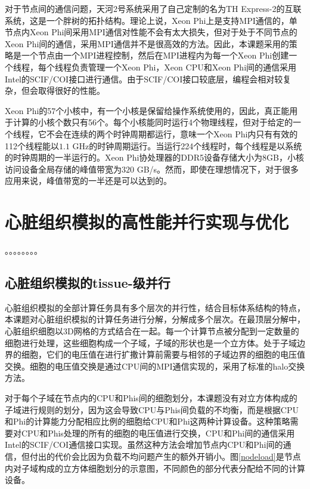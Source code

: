 对于节点间的通信问题，天河2号系统采用了自己定制的名为TH Express-2的互联系统，这是一个胖树的拓扑结构。理论上说，Xeon Phi上是支持MPI通信的，单节点内Xeon Phi间采用MPI通信对性能不会有太大损失，但对于处于不同节点的Xeon Phi间的通信，采用MPI通信并不是很高效的方法。因此，本课题采用的策略是一个节点由一个MPI进程控制，然后在MPI进程内为每一个Xeon Phi创建一个线程，每个线程负责管理一个Xeon Phi，Xeon CPU和Xeon Phi间的通信采用Intel的SCIF/COI接口进行通信。由于SCIF/COI接口较底层，编程会相对较复杂，但会取得很好的性能。

Xeon Phi的57个小核中，有一个小核是保留给操作系统使用的，因此，真正能用于计算的小核个数只有56个。每个小核能同时运行4个物理线程，但对于给定的一个线程，它不会在连续的两个时钟周期都运行，意味一个Xeon Phi内只有有效的112个线程能以$1.1$ GHz的时钟周期运行。当运行224个线程时，每个线程是以系统的时钟周期的一半运行的。Xeon Phi协处理器的DDR5设备存储大小为8GB，小核访问设备全局存储的峰值带宽为$320$ GB/s。然而，即使在理想情况下，对于很多应用来说，峰值带宽的一半还是可以达到的。


\section{心脏组织模拟的高性能并行实现与优化}

。。。。。。。。

\subsection{心脏组织模拟的tissue-级并行}
\label{tissueParallel}
心脏组织模拟的全部计算任务具有多个层次的并行性，结合目标体系结构的特点，本课题对心脏组织模拟的计算任务进行分解，分解成多个层次。在最顶层分解中，心脏组织细胞以3D网格的方式结合在一起。每一个计算节点被分配到一定数量的细胞进行处理，这些细胞构成一个子域，子域的形状也是一个立方体。处于子域边界的细胞，它们的电压值在进行扩撒计算前需要与相邻的子域边界的细胞的电压值交换。细胞的电压值交换是通过CPU间的MPI通信实现的，采用了标准的halo交换方法。

对于每个子域在节点内的CPU和Phis间的细胞划分，本课题没有对立方体构成的子域进行规则的划分，因为这会导致CPU与Phis间负载的不均衡，而是根据CPU和Phi的计算能力分配相应比例的细胞给CPU和Phi这两种计算设备。这种策略需要对CPU和Phis处理的所有的细胞的电压值进行交换，CPU和Phi间的通信采用Intel的SCIF/COI通信接口实现。虽然这种方法会增加节点内CPU和Phi间的通信，但付出的代价会比因为负载不均问题产生的额外开销小。图\ref{nodeload}是节点内对子域构成的立方体细胞划分的示意图，不同颜色的部分代表分配给不同的计算设备。

